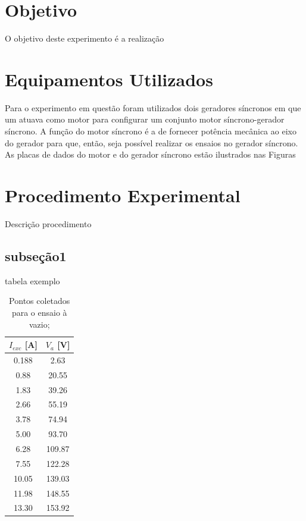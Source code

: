 \documentclass[a4paper, 12pt]{article}
\begin{document}
\newpage
{}

\section{Objetivo}

O objetivo deste experimento é a realização 
\section{Equipamentos Utilizados}

Para o experimento em questão foram utilizados dois geradores síncronos em que um atuava como motor para configurar um conjunto motor síncrono-gerador síncrono. A função do motor síncrono é a de fornecer potência mecânica ao eixo do gerador para que, então, seja possível realizar os ensaios no gerador síncrono. As placas de dados do motor e do gerador síncrono estão ilustrados nas Figuras 

\section{Procedimento Experimental}

Descrição procedimento

\subsection{subseção1}

tabela exemplo

\begin{table}[htb]
\centering
\begin{tabular}{c|c}
$I_{exc}$ [A] & $V_{a}$ [V] \\ \hline
0.188	& 2.63 		\\\hline
0.88 & 20.55	\\\hline
1.83 & 39.26 \\\hline
2.66 & 55.19 \\\hline
3.78 & 74.94 \\\hline
5.00 & 93.70 \\\hline
6.28 & 109.87 \\\hline
7.55 & 122.28 \\\hline
10.05 & 139.03 \\\hline
11.98 & 148.55 \\\hline
13.30 & 153.92 
\end{tabular}
\caption{Pontos coletados para o ensaio à vazio;}
\label{vazio}
\end{table}
\end{document}
